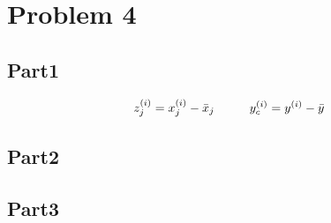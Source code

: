 \section{Problem 4}

\subsection{Part1}

\begin{equation}
z^{(i)}_{j} = x^{(i)}_{j} - \bar{x}_{j} \hspace{10 mm}
y^{(i)}_{c} = y^{(i)} - \bar{y} \\
\end{equation}




\subsection{Part2}

\subsection{Part3}
